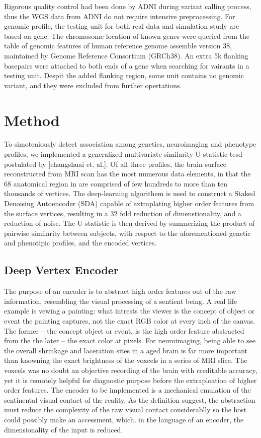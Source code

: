 \documentclass[twocolumn]{article}
\begin{document}
Rigorous quality control had been done by ADNI during variant calling process, thus the WGS data from ADNI do not require intensive preprocessing. For genomic profile, the testing unit for both real data and simulation study are based on gene. The chromosome location of known genes were queried from the table of genomic features of human reference genome assemble version 38, maintained by Genome Reference Consortium (GRCh38). An extra 5k flanking basepairs were attached to both ends of a gene when searching for vairants in a testing unit. Despit the added flanking region, some unit contains no genomic variant, and they were excluded from further opertations.

\section{Method}

To simoteniously detect association among genetics, neuroimaging and phenotype profiles, we implemented a generalized multivariate similarity U statistic tesd postulated by [changshuai et. al.]. Of all three profiles, the brain surface reconstructed from MRI scan has the most numerous data elements, in that the 68 anatomical region in are comprised of few hundreds to more than ten thousands of vertices. The deep-learning algorithem is used to construct a Staked Denoising Autoencoder (SDA) capable of extraplating higher order features from the surface vertices, resulting in a 32 fold reduction of dimenstionality, and a reduction of noise. The U statistic is then derived by summerizing the product of pairwise similarity between subjects, with respect to the aforementioned genetic and phenotipic profiles, and the encoded vertices. 

\subsection{Deep Vertex Encoder}
The purpose of an encoder is to abstract high order features out of the raw information, resembling the visual processing of a sentient being. A real life example is vewing a painting: what intrests the viewer is the concept of object or event the painting captures, not the exact RGB color at every inch of the canvas. The former -- the concept object or event, is the high order feature abstracted from the the later -- the exact color at pixels. For neuroimaging, being able to see the overall shrinkage and laceration sites in a aged brain is far more important than knowning the exact brightness of the voxcels in a series of MRI slice. The voxcels was no doubt an objective recording of the brain with creditable accuracy, yet it is remotely helpful for diagnostic purpose before the extraploation of higher order features. The encoder to be implemented is a mechanical emulation of the sentinental visual contact of the reality. As the definition suggest, the abstraction must reduce the complexity of the raw visual contact considerablly so the host could possibly make an accessment, which, in the language of an encoder, the dimensionality of the input is reduced.  
\end{document}
